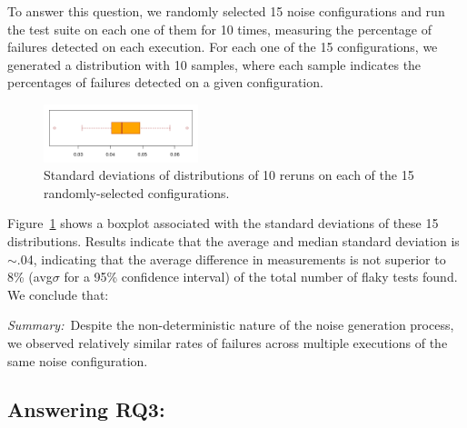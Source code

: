 \documentclass[conference]{IEEEtran}
\begin{document}
To answer this question, we randomly selected 15 noise configurations and run the test suite on each one of them for 10 times, measuring the percentage of failures detected on each execution. For each one of the 15 configurations, we generated a distribution with 10 samples, where each sample indicates the percentages of failures detected on a given configuration. 

\begin{figure}[t!]
    \centering
    \includegraphics[width=0.4\textwidth]{figs/sd-random.png}
    \vspace{-2ex}
    \caption{\label{fig:standard-deviations}Standard deviations of distributions of 10 reruns on each of the 15 randomly-selected configurations.}
    \vspace{-3ex}
\end{figure}

Figure~\ref{fig:standard-deviations} shows a boxplot associated with the standard deviations of these 15 distributions. Results indicate that the average and median standard deviation is $\sim$.04, indicating that the average difference in measurements is not superior to 8\% (avg\textpm$\sigma$ for a 95\% confidence interval) of the total number of flaky tests found. We conclude that:

\begin{center}
\begin{tcolorbox}[enhanced,width=3.4in,center upper,drop shadow southwest,sharp corners]
\emph{Summary:}~Despite the non-deterministic nature of the noise generation process, we observed relatively similar rates of failures across multiple executions of the same noise configuration. 
\end{tcolorbox}
\end{center}


\subsection{Answering RQ3: \rqthree}
\end{document}
